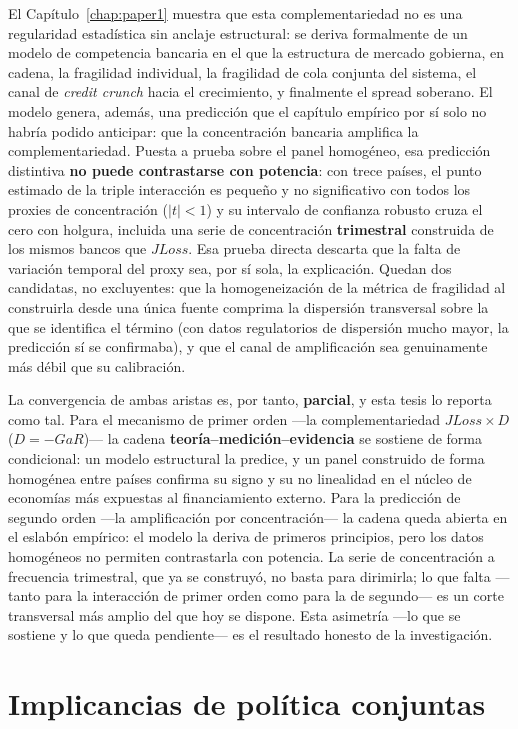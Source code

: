 El Capítulo~\ref{chap:paper1} muestra que esta complementariedad no es una regularidad estadística sin anclaje estructural: se deriva formalmente de un modelo de competencia bancaria en el que la estructura de mercado gobierna, en cadena, la fragilidad individual, la fragilidad de cola conjunta del sistema, el canal de \textit{credit crunch} hacia el crecimiento, y finalmente el spread soberano. El modelo genera, además, una predicción que el capítulo empírico por sí solo no habría podido anticipar: que la concentración bancaria amplifica la complementariedad. Puesta a prueba sobre el panel homogéneo, esa predicción distintiva \textbf{no puede contrastarse con potencia}: con trece países, el punto estimado de la triple interacción es pequeño y no significativo con todos los proxies de concentración ($|t|<1$) y su intervalo de confianza robusto cruza el cero con holgura, incluida una serie de concentración \textbf{trimestral} construida de los mismos bancos que $JLoss$. Esa prueba directa descarta que la falta de variación temporal del proxy sea, por sí sola, la explicación. Quedan dos candidatas, no excluyentes: que la homogeneización de la métrica de fragilidad al construirla desde una única fuente comprima la dispersión transversal sobre la que se identifica el término (con datos regulatorios de dispersión mucho mayor, la predicción sí se confirmaba), y que el canal de amplificación sea genuinamente más débil que su calibración.

La convergencia de ambas aristas es, por tanto, \textbf{parcial}, y esta tesis lo reporta como tal. Para el mecanismo de primer orden —la complementariedad $JLoss\times D$ ($D=-GaR$)— la cadena \textbf{teoría–medición–evidencia} se sostiene de forma condicional: un modelo estructural la predice, y un panel construido de forma homogénea entre países confirma su signo y su no linealidad en el núcleo de economías más expuestas al financiamiento externo. Para la predicción de segundo orden —la amplificación por concentración— la cadena queda abierta en el eslabón empírico: el modelo la deriva de primeros principios, pero los datos homogéneos no permiten contrastarla con potencia. La serie de concentración a frecuencia trimestral, que ya se construyó, no basta para dirimirla; lo que falta —tanto para la interacción de primer orden como para la de segundo— es un corte transversal más amplio del que hoy se dispone. Esta asimetría —lo que se sostiene y lo que queda pendiente— es el resultado honesto de la investigación.

\section{Implicancias de política conjuntas}

